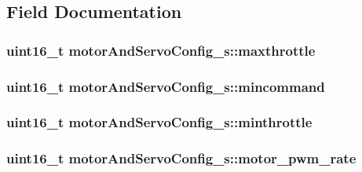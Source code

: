 \subsection{Field Documentation}
\hypertarget{structmotorAndServoConfig__s_a09f82a6a4090a44cfbb552cf6176f5d7}{
\subsubsection[{maxthrottle}]{\setlength{\rightskip}{0pt plus 5cm}uint16\+\_\+t motor\+And\+Servo\+Config\+\_\+s\+::maxthrottle}}\label{structmotorAndServoConfig__s_a09f82a6a4090a44cfbb552cf6176f5d7}
\hypertarget{structmotorAndServoConfig__s_a20dbd179de76cfef03263cf26553f581}{
\subsubsection[{mincommand}]{\setlength{\rightskip}{0pt plus 5cm}uint16\+\_\+t motor\+And\+Servo\+Config\+\_\+s\+::mincommand}}\label{structmotorAndServoConfig__s_a20dbd179de76cfef03263cf26553f581}
\hypertarget{structmotorAndServoConfig__s_ad3bed82a4f0874363461552348ea2936}{
\subsubsection[{minthrottle}]{\setlength{\rightskip}{0pt plus 5cm}uint16\+\_\+t motor\+And\+Servo\+Config\+\_\+s\+::minthrottle}}\label{structmotorAndServoConfig__s_ad3bed82a4f0874363461552348ea2936}
\hypertarget{structmotorAndServoConfig__s_ae3518998777866c6d2beba25be2c5a0b}{
\subsubsection[{motor\+\_\+pwm\+\_\+rate}]{\setlength{\rightskip}{0pt plus 5cm}uint16\+\_\+t motor\+And\+Servo\+Config\+\_\+s\+::motor\+\_\+pwm\+\_\+rate}}\label{structmotorAndServoConfig__s_ae3518998777866c6d2beba25be2c5a0b}
